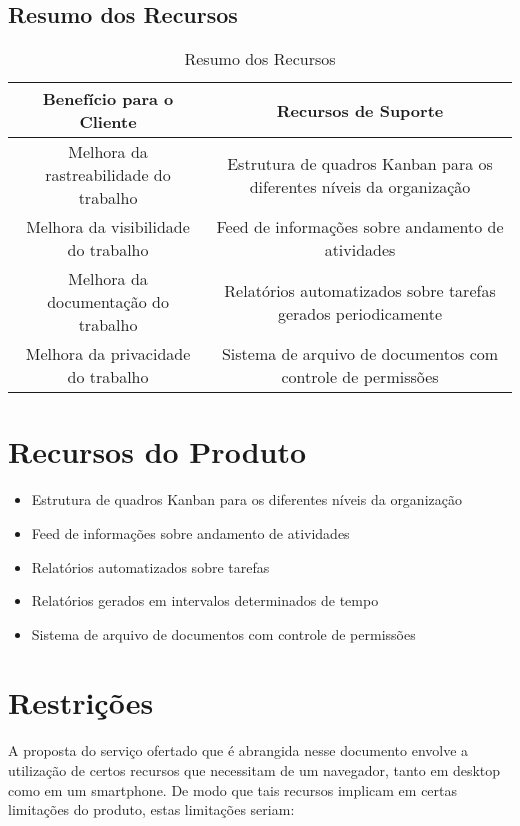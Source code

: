 \begin{apendicesenv}
\subsection{Resumo dos Recursos}
\begin{table}[!h]
  \centering
  \caption{Resumo dos Recursos}
  \begin{tabular}{|c|c|}
    \hline
    \textbf{Benefício para o Cliente}      & \textbf{Recursos de Suporte}                                         \\ \hline
    Melhora da rastreabilidade do trabalho & \parbox[t]{9cm}{Estrutura de quadros Kanban para os diferentes níveis da organização} \\ \hline
    Melhora da visibilidade do trabalho    & \parbox[t]{9cm}{Feed de informações sobre andamento de atividades}                    \\ \hline
    Melhora da documentação do trabalho    & \parbox[t]{9cm}{Relatórios automatizados sobre tarefas gerados periodicamente}        \\ \hline
    Melhora da privacidade do trabalho     & \parbox[t]{9cm}{Sistema de arquivo de documentos com controle de permissões}          \\ \hline
  \end{tabular}
\end{table}

\section{Recursos do Produto}
\begin{itemize}
  \item Estrutura de quadros Kanban para os diferentes níveis da organização
  \item Feed de informações sobre andamento de atividades
  \item Relatórios automatizados sobre tarefas
  \item Relatórios gerados em intervalos determinados de tempo
  \item Sistema de arquivo de documentos com controle de permissões
\end{itemize}

\section{Restrições}
A proposta do serviço ofertado que é abrangida nesse documento envolve a utilização de certos recursos que necessitam de um navegador, tanto em desktop como em um smartphone. De modo que tais recursos implicam em certas limitações do produto, estas limitações seriam:


\end{apendicesenv}
